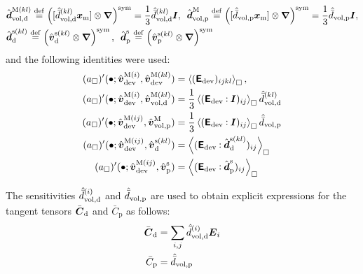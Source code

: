 \documentclass[10pt,a4paper]{article}
\newcommand{\ded}{\mathrm{d}}
\newcommand{\dep}{\mathrm{p}}
\begin{document}
\begin{align}
    & \hat{\ts{d}}^{\macro(kl)}_{\vol,\ded}\defeq\left([\hat{\bar{d}}^{(kl)}_{\vol,\ded}\ta{x}_\mean]\outerp\diff\right)^\sym = \frac{1}{3}\hat{\bar{d}}^{(kl)}_{\vol,\ded}\ts{I}, \,\,\,
    \hat{\ts{d}}^{\macro}_{\vol,\dep}\defeq\left([\hat{\bar{d}}_{\vol,\dep}\ta{x}_\mean]\outerp\diff\right)^\sym = \frac{1}{3}\hat{\bar{d}}_{\vol,\dep}\ts{I},
\nonumber \\
    & \hat{\ts{d}}^{\fluct(kl)}_\ded\defeq\left(\hat{\ta{v}}^{\fluct(kl)}_\ded\outerp\diff\right)^\sym, \,\,\,
    \hat{\ts{d}}^{\fluct}_\dep\defeq\left(\hat{\ta{v}}^{\fluct(kl)}_\dep\outerp\diff\right)^\sym
\label{eq227}
\end{align}
and the following identities were used:
\begin{align}
    ({a}_\Box)'(\bullet;\hat{\ta{v}}^{\macro(i)}_\dev,\hat{\ta{v}}^{\macro(kl)}_\dev)
    & = 
    \left\langle({\tf E}_\dev)_{ijkl}\right\rangle_\Box,
\label{eq225a} \\
    ({a}_\Box)'(\bullet;\hat{\ta{v}}^{\macro(i)}_\dev,\hat{\ta{v}}^{\macro(kl)}_{\vol,\ded})
    & = 
    \frac{1}{3}\left\langle ({\tf E}_\dev\dprod \ts{I})_{ij} \right\rangle_\Box\hat{\bar{d}}^{(kl)}_{\vol,\ded}
\label{eq225b} \\
    ({a}_\Box)'(\bullet;\hat{\ta{v}}^{\macro(ij)}_\dev,\hat{\ta{v}}^{\macro}_{\vol,\dep})
    & = 
    \frac{1}{3}\left\langle ({\tf E}_\dev\dprod \ts{I})_{ij} \right\rangle_\Box\hat{\bar{d}}_{\vol,\dep}
\label{eq225c} \\
    ({a}_\Box)'(\bullet;\hat{\ta{v}}^{\macro(ij)}_\dev,\hat{\ta{v}}^{\fluct(kl)}_\ded)
    & = 
    \left\langle ({\tf E}_\dev\dprod \hat{\ts{d}}^{\fluct(kl)}_\ded)_{ij} \right\rangle_\Box
\label{eq225d} \\
    ({a}_\Box)'(\bullet;\hat{\ta{v}}^{\macro(ij)}_\dev,\hat{\ta{v}}^{\fluct}_\dep)
    & = 
    \left\langle ({\tf E}_\dev\dprod \hat{\ts{d}}^{\fluct}_\dep)_{ij} \right\rangle_\Box
\label{eq225e}
\end{align}

The sensitivities $\hat{\bar{d}}^{(i)}_{\vol,\ded}$ and $\hat{\bar{d}}_{\vol,\dep}$ are used to obtain explicit expressions for the tangent tensors
$\bar{\ts C}_\ded$ and $\bar{C}_\dep$ as follows:
\begin{align}
    \bar{\ts C}_\ded
    & = 
    \sum_{i,j}\hat{\bar{d}}^{(i)}_{\vol,\ded} \ts E_i
\label{eq234a} \\
    \bar{C}_\dep
    & = 
    \hat{\bar{d}}_{\vol,\dep}
\label{eq234b}
\end{align}
\end{document}
